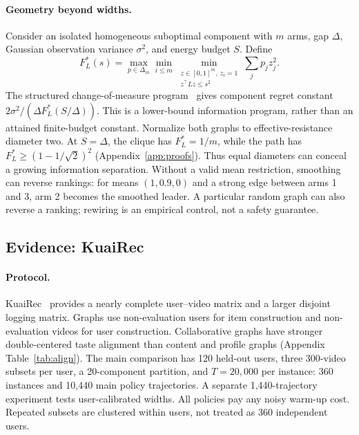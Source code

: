 \documentclass[sigconf,review,anonymous]{acmart}
\begin{document}
\paragraph{Geometry beyond widths.} Consider an isolated homogeneous suboptimal component with $m$ arms, gap $\Delta$, Gaussian observation variance $\sigma^2$, and energy budget $S$. Define
\[
F_L^*(s)=\max_{p\in\Delta_m}\min_{i\le m}\min_{\substack{z\in[0,1]^m,\ z_i=1\\z^\top Lz\le s^2}}\sum_jp_jz_j^2.
\]
The structured change-of-measure program~\cite{combes2017minimal} gives component regret constant $2\sigma^2/(\Delta F_L^*(S/\Delta))$. This is a lower-bound information program, rather than an attained finite-budget constant. Normalize both graphs to effective-resistance diameter two. At $S=\Delta$, the clique has $F_L^*=1/m$, while the path has $F_L^*\ge(1-1/\sqrt2)^2$ (Appendix~\ref{app:proofs}). Thus equal diameters can conceal a growing information separation. Without a valid mean restriction, smoothing can reverse rankings: for means $(1,0.9,0)$ and a strong edge between arms 1 and 3, arm 2 becomes the smoothed leader. A particular random graph can also reverse a ranking; rewiring is an empirical control, not a safety guarantee.

\subsection{Evidence: KuaiRec}\label{sec:evidence}

\paragraph{Protocol.} KuaiRec~\cite{gao2022kuairec} provides a nearly complete user--video matrix and a larger disjoint logging matrix. Graphs use non-evaluation users for item construction and non-evaluation videos for user construction. Collaborative graphs have stronger double-centered taste alignment than content and profile graphs (Appendix Table~\ref{tab:align}). The main comparison has 120 held-out users, three 300-video subsets per user, a 20-component partition, and $T=20{,}000$ per instance: 360 instances and 10,440 main policy trajectories. A separate 1,440-trajectory experiment tests user-calibrated widths. All policies pay any noisy warm-up cost. Repeated subsets are clustered within users, not treated as 360 independent users.
\end{document}

